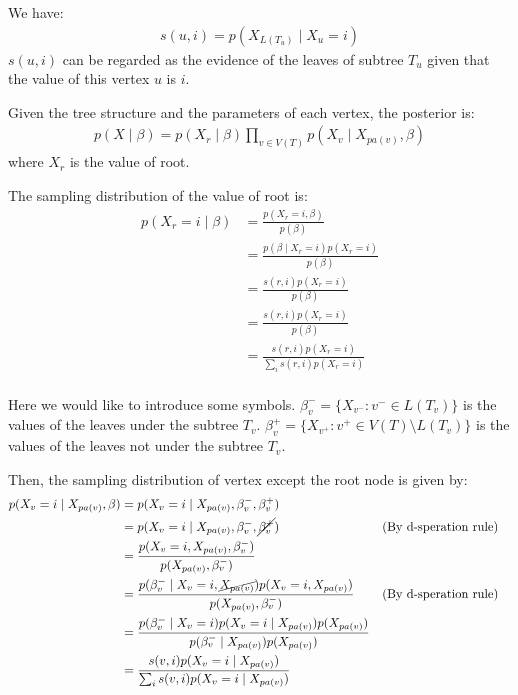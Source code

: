 \documentclass[12pt]{article}
\newenvironment{problem}[2][Problem]{\begin{trivlist}
\item[\hskip \labelsep {\bfseries #1}\hskip \labelsep {\bfseries #2.}]}{\end{trivlist}}
\begin{document}
\begin{problem}{2.5.15}

We have:
\begin{align*}
    s(u, i) = p(X_{L(T_u)} \mid X_u = i)
\end{align*}
$s(u,i)$ can be regarded as the evidence of the leaves of subtree $T_u$ given that
the value of this vertex $u$ is $i$.

Given the tree structure and the parameters of each vertex, the posterior is:
\begin{align*}
    p(X\mid \beta) = p(X_r\mid \beta)\prod_{v\in V(T)} p(X_v\mid X_{pa(v)}, \beta)
\end{align*}
where $X_r$ is the value of root.

The sampling distribution of the value of root is:
\begin{align*}
    p(X_r = i\mid \beta) &= \frac{p(X_r = i, \beta)}{p(\beta)} \\
    &= \frac{p(\beta \mid X_r =i)p(X_r =i)}{p(\beta)} \\
    &= \frac{s(r,i)p(X_r =i)}{p(\beta)} \\
    &= \frac{s(r,i)p(X_r =i)}{p(\beta)} \\
    &= \frac{s(r,i)p(X_r =i)}{\sum_{i}s(r,i)p(X_r =i)} \\
\end{align*}

Here we would like to introduce some symbols. 
$\beta^{-}_{v} = \{X_{v^{-}}: v^{-} \in L(T_v)\}$ is the values of the leaves
under the subtree $T_v$.
$\beta^{+}_{v} = \{X_{v^{+}}: v^{+} \in V(T) \setminus L(T_v)\}$ is the values of
the leaves not under the subtree $T_v$.

Then, the sampling distribution of vertex except the root node is given by:
\begin{align*}
    p(X_v = i\mid X_{pa(v)}, \beta) 
    &= p(X_v = i\mid X_{pa(v)}, \beta^{-}_{v}, \beta^{+}_{v}) \\
    &= p(X_v = i\mid X_{pa(v)}, \beta^{-}_{v}, \cancel{\beta^{+}_{v}}) && \text{(By d-speration rule)}\\
    &= \frac{p(X_v = i, X_{pa(v)}, \beta^{-}_{v})}{p(X_{pa(v)}, \beta^{-}_{v})} \\
    &= \frac{p(\beta^{-}_{v}\mid X_v = i, \cancel{X_{pa(v)}})p(X_v = i, X_{pa(v)})}
        {p(X_{pa(v)}, \beta^{-}_{v})} && \text{(By d-speration rule)}\\
    &= \frac{p(\beta^{-}_{v}\mid X_v = i)p(X_v = i\mid X_{pa(v)})p(X_{pa(v)})}
        {p(\beta^{-}_{v}\mid X_{pa(v)})p(X_{pa(v)})} \\
    &= \frac{s(v,i)p(X_v = i\mid X_{pa(v)})}
            {\sum_{i}s(v,i)p(X_v = i\mid X_{pa(v)})}
\end{align*}


\end{problem}
\end{document}
